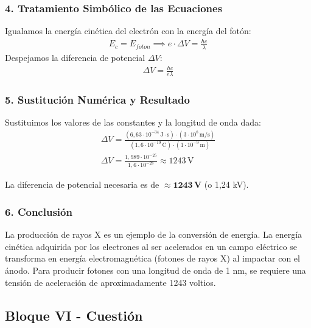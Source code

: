 \subsubsection*{4. Tratamiento Simbólico de las Ecuaciones}
Igualamos la energía cinética del electrón con la energía del fotón:
\begin{gather}
    E_c = E_{foton} \implies e \cdot \Delta V = \frac{hc}{\lambda}
\end{gather}
Despejamos la diferencia de potencial $\Delta V$:
\begin{gather}
    \Delta V = \frac{hc}{e\lambda}
\end{gather}

\subsubsection*{5. Sustitución Numérica y Resultado}
Sustituimos los valores de las constantes y la longitud de onda dada:
\begin{gather}
    \Delta V = \frac{(6,63 \cdot 10^{-34} \, \text{J}\cdot\text{s}) \cdot (3 \cdot 10^8 \, \text{m/s})}{(1,6 \cdot 10^{-19} \, \text{C}) \cdot (1 \cdot 10^{-9} \, \text{m})} \\
    \Delta V = \frac{1,989 \cdot 10^{-25}}{1,6 \cdot 10^{-28}} \approx 1243 \, \text{V}
\end{gather}
\begin{cajaresultado}
    La diferencia de potencial necesaria es de $\boldsymbol{\approx 1243 \, \textbf{V}}$ (o 1,24 kV).
\end{cajaresultado}

\subsubsection*{6. Conclusión}
\begin{cajaconclusion}
La producción de rayos X es un ejemplo de la conversión de energía. La energía cinética adquirida por los electrones al ser acelerados en un campo eléctrico se transforma en energía electromagnética (fotones de rayos X) al impactar con el ánodo. Para producir fotones con una longitud de onda de 1 nm, se requiere una tensión de aceleración de aproximadamente 1243 voltios.
\end{cajaconclusion}

\newpage

\subsection{Bloque VI - Cuestión}
\label{subsec:A6_2010_sep_ext}

